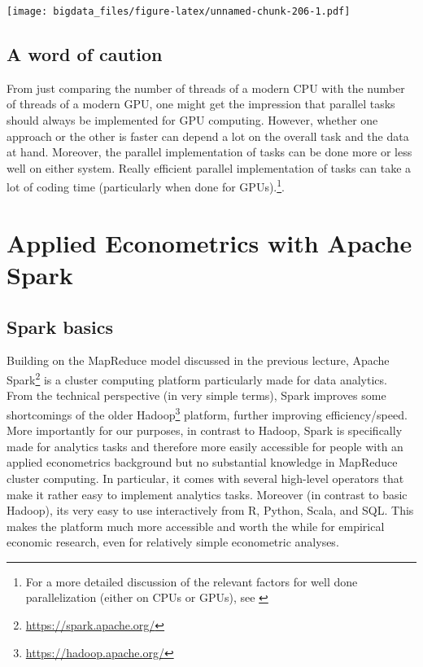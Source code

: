 \documentclass[
  12pt,
]{style/krantz}
\renewcommand{\href}[2]{#2\footnote{\url{#1}}}
\begin{document}
\texttt{[image: bigdata\_files/figure-latex/unnamed-chunk-206-1.pdf]}

\hypertarget{a-word-of-caution}{%
\section{A word of caution}\label{a-word-of-caution}}

From just comparing the number of threads of a modern CPU with the number of threads of a modern GPU, one might get the impression that parallel tasks should always be implemented for GPU computing. However, whether one approach or the other is faster can depend a lot on the overall task and the data at hand. Moreover, the parallel implementation of tasks can be done more or less well on either system. Really efficient parallel implementation of tasks can take a lot of coding time (particularly when done for GPUs).\footnote{For a more detailed discussion of the relevant factors for well done parallelization (either on CPUs or GPUs), see \citet{matloff_2015}}.

\hypertarget{applied-econometrics-with-apache-spark}{%
\chapter{Applied Econometrics with Apache Spark}\label{applied-econometrics-with-apache-spark}}

\hypertarget{spark-basics}{%
\section{Spark basics}\label{spark-basics}}

Building on the MapReduce model discussed in the previous lecture, \href{https://spark.apache.org/}{Apache Spark} is a cluster computing platform particularly made for data analytics. From the technical perspective (in very simple terms), Spark improves some shortcomings of the older \href{https://hadoop.apache.org/}{Hadoop} platform, further improving efficiency/speed. More importantly for our purposes, in contrast to Hadoop, Spark is specifically made for analytics tasks and therefore more easily accessible for people with an applied econometrics background but no substantial knowledge in MapReduce cluster computing. In particular, it comes with several high-level operators that make it rather easy to implement analytics tasks. Moreover (in contrast to basic Hadoop), its very easy to use interactively from R, Python, Scala, and SQL. This makes the platform much more accessible and worth the while for empirical economic research, even for relatively simple econometric analyses.
\end{document}
